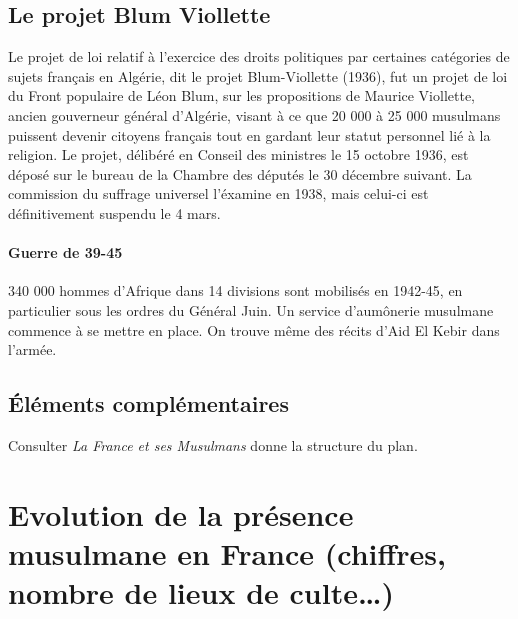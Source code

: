\subsection{Le projet Blum Viollette}
Le projet de loi relatif à l'exercice des droits politiques par certaines catégories de sujets français en Algérie, dit le projet Blum-Viollette (1936), fut un projet de loi du Front populaire de Léon Blum, sur les propositions de Maurice Viollette, ancien gouverneur général d'Algérie, visant à ce que 20 000 à 25 000 musulmans puissent devenir citoyens français tout en gardant leur statut personnel lié à la religion. Le projet, délibéré en Conseil des ministres le 15 octobre 1936, est déposé sur le bureau de la Chambre des députés le 30 décembre suivant. La commission du suffrage universel l'éxamine en 1938, mais celui-ci est définitivement suspendu le 4 mars.

\paragraph{Guerre de 39-45}
340 000 hommes d'Afrique dans 14 divisions sont mobilisés en 1942-45, en particulier sous les ordres du Général Juin. Un service d'aumônerie musulmane commence à se mettre en place. On trouve même des récits d'Aid El Kebir dans l'armée. 

\subsection{Éléments complémentaires}

Consulter \emph{La France et ses Musulmans} donne la structure du plan.

\section{Evolution de la présence musulmane en France (chiffres, nombre de lieux de
culte…)}

